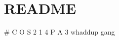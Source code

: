 \chapter{README}
\hypertarget{md_README}{}\label{md_README}
{\ucr}{\ucr}\# C O S 2 1 4 P A 3 whaddup gang 